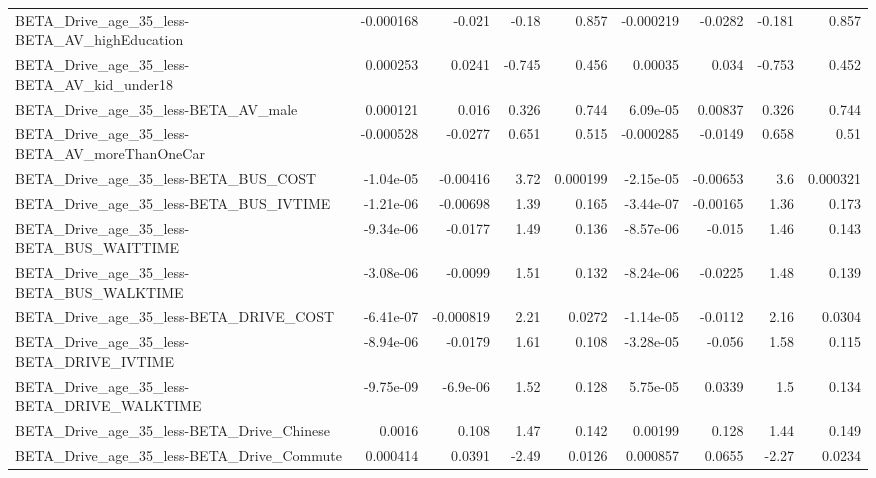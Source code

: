 \begin{tabular}{lrrrrrrrr}
BETA\_Drive\_age\_35\_less-BETA\_AV\_highEducation       &   -0.000168 &       -0.021 &    -0.18 &    0.857 &  -0.000219 &     -0.0282 &       -0.181 &         0.857 \\
BETA\_Drive\_age\_35\_less-BETA\_AV\_kid\_under18         &    0.000253 &       0.0241 &   -0.745 &    0.456 &    0.00035 &       0.034 &       -0.753 &         0.452 \\
BETA\_Drive\_age\_35\_less-BETA\_AV\_male                &    0.000121 &        0.016 &    0.326 &    0.744 &   6.09e-05 &     0.00837 &        0.326 &         0.744 \\
BETA\_Drive\_age\_35\_less-BETA\_AV\_moreThanOneCar      &   -0.000528 &      -0.0277 &    0.651 &    0.515 &  -0.000285 &     -0.0149 &        0.658 &          0.51 \\
BETA\_Drive\_age\_35\_less-BETA\_BUS\_COST               &   -1.04e-05 &     -0.00416 &     3.72 & 0.000199 &  -2.15e-05 &    -0.00653 &          3.6 &      0.000321 \\
BETA\_Drive\_age\_35\_less-BETA\_BUS\_IVTIME             &   -1.21e-06 &     -0.00698 &     1.39 &    0.165 &  -3.44e-07 &    -0.00165 &         1.36 &         0.173 \\
BETA\_Drive\_age\_35\_less-BETA\_BUS\_WAITTIME           &   -9.34e-06 &      -0.0177 &     1.49 &    0.136 &  -8.57e-06 &      -0.015 &         1.46 &         0.143 \\
BETA\_Drive\_age\_35\_less-BETA\_BUS\_WALKTIME           &   -3.08e-06 &      -0.0099 &     1.51 &    0.132 &  -8.24e-06 &     -0.0225 &         1.48 &         0.139 \\
BETA\_Drive\_age\_35\_less-BETA\_DRIVE\_COST             &   -6.41e-07 &    -0.000819 &     2.21 &   0.0272 &  -1.14e-05 &     -0.0112 &         2.16 &        0.0304 \\
BETA\_Drive\_age\_35\_less-BETA\_DRIVE\_IVTIME           &   -8.94e-06 &      -0.0179 &     1.61 &    0.108 &  -3.28e-05 &      -0.056 &         1.58 &         0.115 \\
BETA\_Drive\_age\_35\_less-BETA\_DRIVE\_WALKTIME         &   -9.75e-09 &     -6.9e-06 &     1.52 &    0.128 &   5.75e-05 &      0.0339 &          1.5 &         0.134 \\
BETA\_Drive\_age\_35\_less-BETA\_Drive\_Chinese          &      0.0016 &        0.108 &     1.47 &    0.142 &    0.00199 &       0.128 &         1.44 &         0.149 \\
BETA\_Drive\_age\_35\_less-BETA\_Drive\_Commute          &    0.000414 &       0.0391 &    -2.49 &   0.0126 &   0.000857 &      0.0655 &        -2.27 &        0.0234 \\

\end{tabular}
